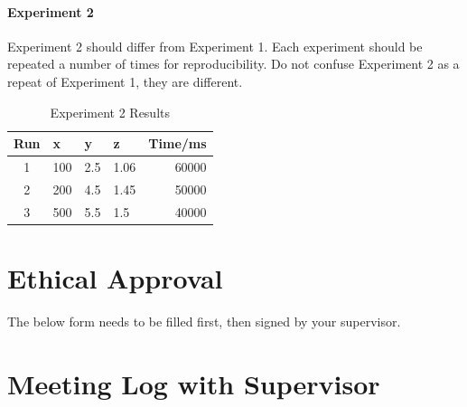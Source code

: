 \subsubsection{Experiment 2}
Experiment 2 should differ from Experiment 1. Each experiment should be repeated a number of times for reproducibility. Do not confuse Experiment 2 as a repeat of Experiment 1, they are different. 

\begin{table}
	\centering
	\begin{tabular}{|c|l|l|l||r|}\hline
	Run	&	x	&	y 	&	z	& Time/ms\\ \hline
	1	&	100	&	2.5	& 	1.06	& 60000 \\ \hline
	2	&	200	&	4.5	&	1.45	& 50000 \\ \hline
	3	&	500	&	5.5	&	1.5	& 40000 \\ \hline
	\end{tabular}
	\caption{Experiment 2 Results}
	\label{ta:ex2}
\end{table}


\chapter{Ethical Approval}
The below form needs to be filled first, then signed by your supervisor.


\chapter{Meeting Log with Supervisor}
